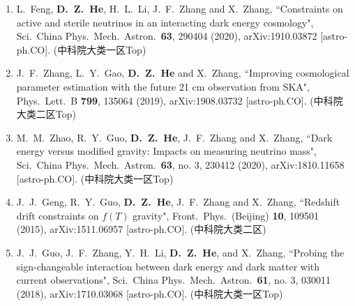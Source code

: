 \begin{enumerate}[leftmargin=*]
    \item L.~Feng, {\bf D.~Z.~He}, H.~L.~Li, J.~F.~Zhang and X.~Zhang, ``Constraints on active and sterile neutrinos in an interacting dark energy cosmology", Sci.\ China Phys.\ Mech.\ Astron.\  {\bf 63}, 290404 (2020), arXiv:1910.03872 [astro-ph.CO]. (中科院大类一区Top)

    \item J.~F.~Zhang, L.~Y.~Gao, \textbf{D.~Z.~He} and X.~Zhang, ``Improving cosmological parameter estimation with the future 21 cm observation from SKA", Phys.\ Lett.\ B {\bf 799}, 135064 (2019), arXiv:1908.03732 [astro-ph.CO]. (中科院大类二区Top)
     
    \item  M.~M.~Zhao, R.~Y.~Guo, \textbf{D.~Z.~He}, J.~F.~Zhang and X.~Zhang, ``Dark energy versus modified gravity: Impacts on measuring neutrino mass", Sci.\ China Phys.\ Mech.\ Astron.\ {\bf 63}, no. 3, 230412 (2020), arXiv:1810.11658 [astro-ph.CO]. (中科院大类一区Top)
 
    \item J.~J.~Geng, R.~Y.~Guo, \textbf{D.~Z.~He}, J.~F.~Zhang and X.~Zhang, ``Redshift drift constraints on $f(T)$ gravity", Front.\ Phys.\ (Beijing) {\bf 10}, 109501 (2015), arXiv:1511.06957 [astro-ph.CO]. (中科院大类二区)
  
    \item J.~J.~Guo, J.~F.~Zhang, Y.~H.~Li, \textbf{D.~Z.~He}, and X.~Zhang, ``Probing the sign-changeable interaction between dark energy and dark matter with current observations", Sci.\ China Phys.\ Mech.\ Astron.\ {\bf 61}, no. 3, 030011 (2018), arXiv:1710.03068 [astro-ph.CO]. (中科院大类一区Top)

  \end{enumerate}    
